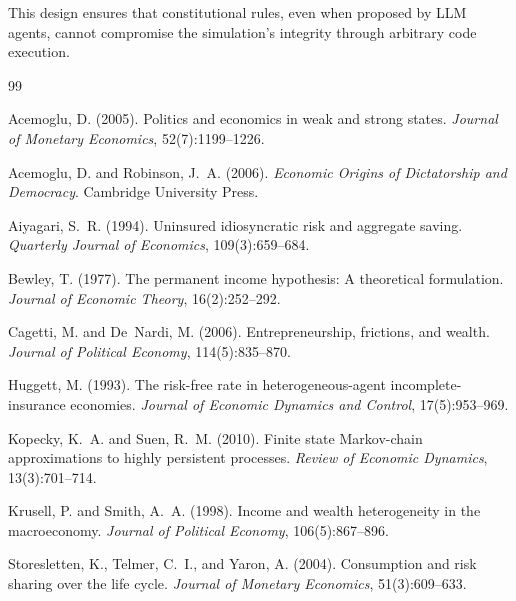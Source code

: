 \documentclass[12pt]{article}
\begin{document}
This design ensures that constitutional rules, even when proposed by LLM agents, cannot compromise the simulation's integrity through arbitrary code execution.




\begin{thebibliography}{99}

Acemoglu, D. (2005).
\newblock Politics and economics in weak and strong states.
\newblock \textit{Journal of Monetary Economics}, 52(7):1199--1226.

Acemoglu, D. and Robinson, J.~A. (2006).
\newblock \textit{Economic Origins of Dictatorship and Democracy}.
\newblock Cambridge University Press.

Aiyagari, S.~R. (1994).
\newblock Uninsured idiosyncratic risk and aggregate saving.
\newblock \textit{Quarterly Journal of Economics}, 109(3):659--684.

Bewley, T. (1977).
\newblock The permanent income hypothesis: A theoretical formulation.
\newblock \textit{Journal of Economic Theory}, 16(2):252--292.

Cagetti, M. and De~Nardi, M. (2006).
\newblock Entrepreneurship, frictions, and wealth.
\newblock \textit{Journal of Political Economy}, 114(5):835--870.

Huggett, M. (1993).
\newblock The risk-free rate in heterogeneous-agent incomplete-insurance economies.
\newblock \textit{Journal of Economic Dynamics and Control}, 17(5):953--969.

Kopecky, K.~A. and Suen, R.~M. (2010).
\newblock Finite state {M}arkov-chain approximations to highly persistent processes.
\newblock \textit{Review of Economic Dynamics}, 13(3):701--714.

Krusell, P. and Smith, A.~A. (1998).
\newblock Income and wealth heterogeneity in the macroeconomy.
\newblock \textit{Journal of Political Economy}, 106(5):867--896.

Storesletten, K., Telmer, C.~I., and Yaron, A. (2004).
\newblock Consumption and risk sharing over the life cycle.
\newblock \textit{Journal of Monetary Economics}, 51(3):609--633.


\end{thebibliography}
\end{document}
